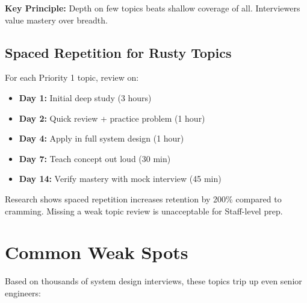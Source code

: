 \documentclass[10pt]{article}
\begin{document}
\textbf{Key Principle:} Depth on few topics beats shallow coverage of all. Interviewers value mastery over breadth.

\subsection{Spaced Repetition for Rusty Topics}

For each Priority 1 topic, review on:
\begin{itemize}
\item \textbf{Day 1:} Initial deep study (3 hours)
\item \textbf{Day 2:} Quick review + practice problem (1 hour)
\item \textbf{Day 4:} Apply in full system design (1 hour)
\item \textbf{Day 7:} Teach concept out loud (30 min)
\item \textbf{Day 14:} Verify mastery with mock interview (45 min)
\end{itemize}

Research shows spaced repetition increases retention by 200\% compared to cramming. Missing a weak topic review is unacceptable for Staff-level prep.

\section{Common Weak Spots}

Based on thousands of system design interviews, these topics trip up even senior engineers:
\end{document}
